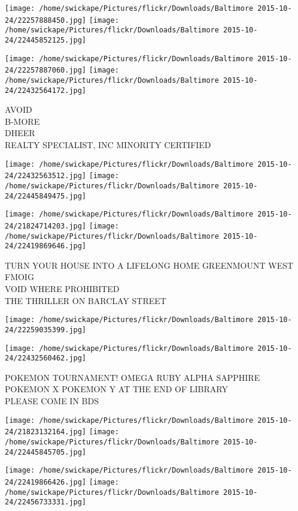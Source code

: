 \documentclass[10pt,letterpaper]{article}
\begin{document}
\texttt{[image: /home/swickape/Pictures/flickr/Downloads/Baltimore 2015-10-24/22257888450.jpg]}
\texttt{[image: /home/swickape/Pictures/flickr/Downloads/Baltimore 2015-10-24/22445852125.jpg]}

\texttt{[image: /home/swickape/Pictures/flickr/Downloads/Baltimore 2015-10-24/22257887060.jpg]}
\texttt{[image: /home/swickape/Pictures/flickr/Downloads/Baltimore 2015-10-24/22432564172.jpg]}

AVOID\\
B{-}MORE\\
DHEER\\
REALTY SPECIALIST, INC MINORITY CERTIFIED
\pagebreak

\texttt{[image: /home/swickape/Pictures/flickr/Downloads/Baltimore 2015-10-24/22432563512.jpg]}
\texttt{[image: /home/swickape/Pictures/flickr/Downloads/Baltimore 2015-10-24/22445849475.jpg]}

\texttt{[image: /home/swickape/Pictures/flickr/Downloads/Baltimore 2015-10-24/21824714203.jpg]}
\texttt{[image: /home/swickape/Pictures/flickr/Downloads/Baltimore 2015-10-24/22419869646.jpg]}

TURN YOUR HOUSE INTO A LIFELONG HOME GREENMOUNT WEST\\
FMOIG\\
VOID WHERE PROHIBITED\\
THE THRILLER ON BARCLAY STREET
\pagebreak

\texttt{[image: /home/swickape/Pictures/flickr/Downloads/Baltimore 2015-10-24/22259035399.jpg]}

\vspace{0.25in}
\texttt{[image: /home/swickape/Pictures/flickr/Downloads/Baltimore 2015-10-24/22432560462.jpg]}

POKEMON TOURNAMENT!  OMEGA RUBY ALPHA SAPPHIRE POKEMON X POKEMON Y AT THE END OF LIBRARY\\
PLEASE COME IN BDS
\pagebreak

\texttt{[image: /home/swickape/Pictures/flickr/Downloads/Baltimore 2015-10-24/21823132164.jpg]}
\texttt{[image: /home/swickape/Pictures/flickr/Downloads/Baltimore 2015-10-24/22445845705.jpg]}

\texttt{[image: /home/swickape/Pictures/flickr/Downloads/Baltimore 2015-10-24/22419866426.jpg]}
\texttt{[image: /home/swickape/Pictures/flickr/Downloads/Baltimore 2015-10-24/22456733331.jpg]}
\end{document}
